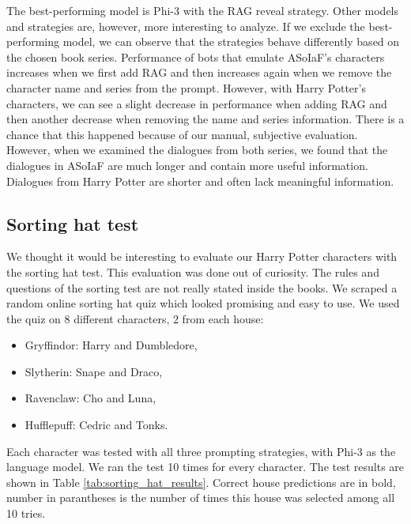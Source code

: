 \documentclass[fleqn,moreauthors,10pt]{ds_report}
\begin{document}
The best-performing model is Phi-3 with the RAG reveal strategy.
Other models and strategies are, however, more interesting to analyze.
If we exclude the best-performing model, we can observe that the strategies behave differently based on the chosen book series.
Performance of bots that emulate ASoIaF's characters increases when we first add RAG and then increases again when we remove the character name and series from the prompt.
However, with Harry Potter's characters, we can see a slight decrease in performance when adding RAG and then another decrease when removing the name and series information.
There is a chance that this happened because of our manual, subjective evaluation.
However, when we examined the dialogues from both series, we found that the dialogues in ASoIaF are much longer and contain more useful information.
Dialogues from Harry Potter are shorter and often lack meaningful information.

\subsection*{Sorting hat test}
We thought it would be interesting to evaluate our Harry Potter characters with the sorting hat test.
This evaluation was done out of curiosity. The rules and questions of the sorting test are not really stated inside the books.
We scraped a random online sorting hat quiz which looked promising and easy to use.
We used the quiz on 8 different characters, 2 from each house:
\begin{itemize}
	\item Gryffindor: Harry and Dumbledore,
	\item Slytherin: Snape and Draco,
	\item Ravenclaw: Cho and Luna,
	\item Hufflepuff: Cedric and Tonks.
\end{itemize}
Each character was tested with all three prompting strategies, with Phi-3 as the language model.
We ran the test 10 times for every character.
The test results are shown in Table \ref*{tab:sorting_hat_results}.
Correct house predictions are in bold, number in parantheses is the number of times this house was selected among all 10 tries.
\end{document}
